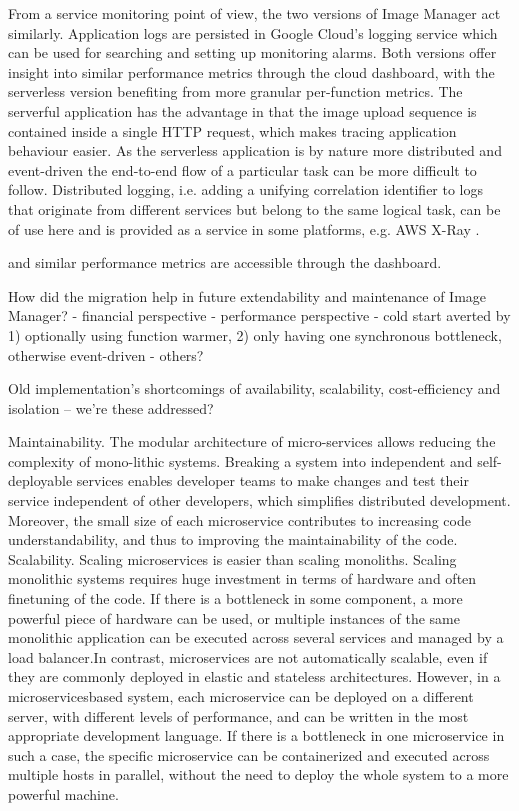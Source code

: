 From a service monitoring point of view, the two versions of Image Manager act similarly. Application logs are persisted in Google Cloud's logging service which can be used for searching and setting up monitoring alarms. Both versions offer insight into similar performance metrics through the cloud dashboard, with the serverless version benefiting from more granular per-function metrics. The serverful application has the advantage in that the image upload sequence is contained inside a single HTTP request, which makes tracing application behaviour easier. As the serverless application is by nature more distributed and event-driven the end-to-end flow of a particular task can be more difficult to follow. Distributed logging, i.e. adding a unifying correlation identifier to logs that originate from different services but belong to the same logical task, can be of use here and is provided as a service in some platforms, e.g. AWS X-Ray \parencite{awslambda0218}.

and similar performance metrics are accessible through the dashboard.

How did the migration help in future extendability and maintenance of Image Manager?
- financial perspective
- performance perspective
  - cold start averted by 1) optionally using function warmer, 2) only having one synchronous bottleneck, otherwise event-driven
- others?

Old implementation's shortcomings of availability, scalability, cost-efficiency and isolation -- we're these addressed?

Maintainability. The modular architecture of micro-services  allows  reducing  the  complexity  of  mono-lithic  systems.  Breaking  a  system  into  independent  and    self-deployable    services    enables    developer    teams  to  make  changes  and  test  their  service  independent  of  other  developers,  which  simplifies  distributed  development.  Moreover,  the  small  size  of  each  microservice  contributes  to  increasing  code understandability,  and  thus  to  improving  the  maintainability of the code.
Scalability. Scaling microservices is easier than scaling  monoliths.  Scaling  monolithic  systems  requires  huge  investment  in  terms  of  hardware  and  often  finetuning  of  the  code.  If  there  is  a  bottleneck  in  some  component,  a  more  powerful  piece  of  hardware can be used, or multiple instances of the same monolithic  application  can  be  executed  across  several services and managed by a load balancer.In   contrast,   microservices   are   not   automatically  scalable,  even  if  they  are  commonly  deployed  in  elastic  and  stateless  architectures.  However,  in  a  microservicesbased  system,  each  microservice  can  be deployed on a different server, with different levels of  performance,  and  can  be  written  in  the  most  appropriate  development  language.  If  there  is  a  bottleneck  in  one  microservice  in  such  a  case,  the  specific microservice can be containerized and executed across multiple hosts in parallel, without the need to deploy the whole system to a more powerful machine.

